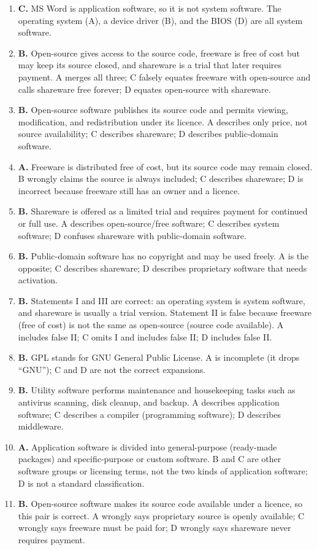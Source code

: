 \documentclass[11pt]{article}
\begin{document}
\begin{enumerate}[label=\textbf{Q\arabic*.}, leftmargin=*]
  sits between the operating system and application software, offering
  services such as messaging and authentication. B describes cabling; C
  describes shareware; D describes hardware.
\item \textbf{C.} MS Word is application software, so it is not system
  software. The operating system (A), a device driver (B), and the BIOS (D)
  are all system software.
\item \textbf{B.} Open-source gives access to the source code, freeware is
  free of cost but may keep its source closed, and shareware is a trial that
  later requires payment. A merges all three; C falsely equates freeware with
  open-source and calls shareware free forever; D equates open-source with
  shareware.
\item \textbf{B.} Open-source software publishes its source code and permits
  viewing, modification, and redistribution under its licence. A describes
  only price, not source availability; C describes shareware; D describes
  public-domain software.
\item \textbf{A.} Freeware is distributed free of cost, but its source code
  may remain closed. B wrongly claims the source is always included; C
  describes shareware; D is incorrect because freeware still has an owner and
  a licence.
\item \textbf{B.} Shareware is offered as a limited trial and requires
  payment for continued or full use. A describes open-source/free software; C
  describes system software; D confuses shareware with public-domain
  software.
\item \textbf{B.} Public-domain software has no copyright and may be used
  freely. A is the opposite; C describes shareware; D describes proprietary
  software that needs activation.
\item \textbf{B.} Statements I and III are correct: an operating system is
  system software, and shareware is usually a trial version. Statement II is
  false because freeware (free of cost) is not the same as open-source
  (source code available). A includes false II; C omits I and includes false
  II; D includes false II.
\item \textbf{B.} GPL stands for GNU General Public License. A is incomplete
  (it drops ``GNU''); C and D are not the correct expansions.
\item \textbf{B.} Utility software performs maintenance and housekeeping
  tasks such as antivirus scanning, disk cleanup, and backup. A describes
  application software; C describes a compiler (programming software); D
  describes middleware.
\item \textbf{A.} Application software is divided into general-purpose
  (ready-made packages) and specific-purpose or custom software. B and C are
  other software groups or licensing terms, not the two kinds of application
  software; D is not a standard classification.
\item \textbf{B.} Open-source software makes its source code available under
  a licence, so this pair is correct. A wrongly says proprietary source is
  openly available; C wrongly says freeware must be paid for; D wrongly says
  shareware never requires payment.


\end{enumerate}
\end{document}
